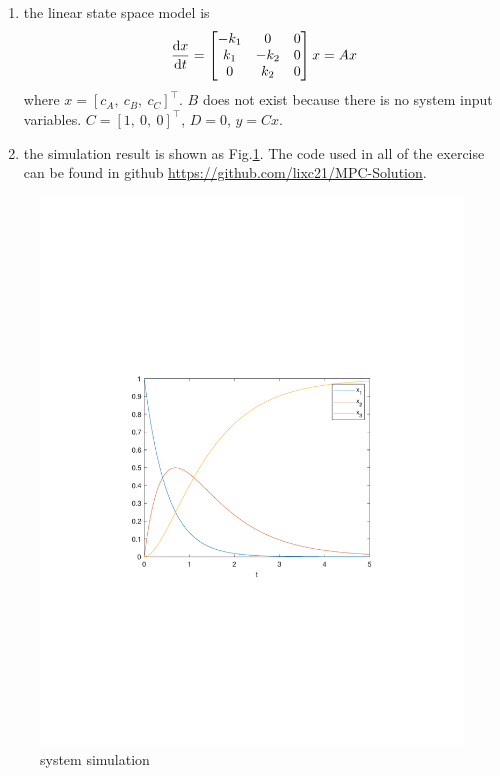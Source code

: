 \documentclass[11pt,a4paper]{report}
\theoremstyle{definition}\newtheorem{exercise}{Exercise}[chapter]
\begin{document}
\begin{answer}
\begin{enumerate}[label=(\alph*)]
    \item the linear state space model is
    \begin{equation}
        \dv{x}{t} = 
        \begin{bmatrix}
            -k_1 &0 &0 \\
            k_1 &-k_2 &0 \\
            0 &k_2 &0 \\
        \end{bmatrix} x = A x
    \end{equation}
    where $x=[c_A,\ c_B,\ c_C]^\top$. $B$ does not exist because there is no system input variables. $C=[1,\ 0,\ 0]^\top$, $D=0$, $y=Cx$.
    
    \item the simulation result is shown as Fig.\ref{fig:exer1}. The code used in all of the exercise can be found in github \url{https://github.com/lixc21/MPC-Solution}.
\end{enumerate}
\begin{figure}[htbp]
    \centering
    \includegraphics[width=\linewidth/2]{./code_ch1/exer1.pdf}
    \caption{system simulation}
    \label{fig:exer1}
\end{figure}
\end{answer}
\end{document}
